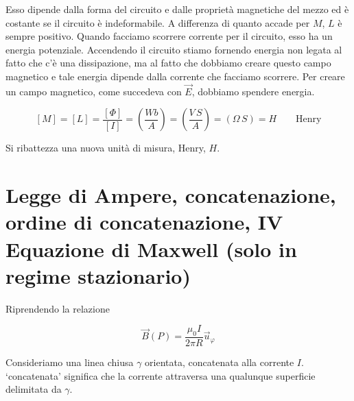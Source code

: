 Esso dipende dalla forma del circuito e dalle proprietà magnetiche del mezzo ed è costante se il circuito è indeformabile. A differenza di quanto accade per $M$, $L$ è sempre positivo.
Quando facciamo scorrere corrente per il circuito, esso ha un energia potenziale. Accendendo il circuito stiamo fornendo energia non legata al fatto che c'è una dissipazione, ma al fatto che dobbiamo creare questo campo magnetico e tale energia dipende dalla corrente che facciamo scorrere. Per creare un campo magnetico, come succedeva con $\vec{E}$, dobbiamo spendere energia.

\[
	[M]=[L]=\frac{[\Phi ]}{[I]} = \left( \frac{Wb}{A} \right) =\left( \frac{V\,S}{A} \right) = (\Omega\,S) = H  \qquad \text{Henry}
\]

Si ribattezza una nuova unità di misura, Henry, $H$.

\section{Legge di Ampere, concatenazione, ordine di concatenazione, IV Equazione di Maxwell (solo in regime stazionario)}

Riprendendo la relazione

\[
	\vec{B} (P) = \frac{\mu_0 I}{2\pi R}\vec{u}_{\varphi}
\]

Consideriamo una linea chiusa $\gamma$ orientata, concatenata alla corrente $I$. `concatenata' significa che la corrente attraversa una qualunque superficie delimitata da $\gamma$.

